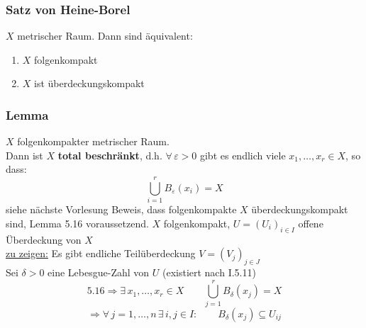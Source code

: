 \subsubsection{Satz von Heine-Borel} %
\label{ssub:satz_von_heine_borel}
$X$ metrischer Raum. Dann sind äquivalent:
\begin{enumerate}
	\item $X$ folgenkompakt
	\item $X$ ist überdeckungskompakt
\end{enumerate}

\subsubsection{Lemma} %
\label{ssub:lemma}
$X$ folgenkompakter metrischer Raum. \\
Dann ist $X$ {\bfseries total beschränkt}, d.h. $\forall\, \varepsilon>0$ gibt es endlich viele $x_1,\dots,x_r \in X$, so dass:
\[
	\bigcup\limits_{i=1}^r B_{\varepsilon}(x_i)=X
\]
 siehe nächste Vorlesung
\newpage
Beweis, dass folgenkompakte $X$ überdeckungskompakt sind, Lemma 5.16 voraussetzend.
$X$ folgenkompakt, $U=(U_i)_{i \in I}$ offene Überdeckung von $X$ \\
\underline{zu zeigen:} Es gibt endliche Teilüberdeckung $V=(V_j)_{j \in J}$ \\
Sei $\delta>0$ eine Lebesgue-Zahl von $U$ (existiert nach I.5.11)
\[
	5.16 \Rightarrow \exists\, x_1, \dots, x_r \in X \qquad \bigcup\limits_{j=1}^r B_{\delta}(x_j)=X
\]
\[
	\Rightarrow \forall\, j=1,\dots,n \, \exists\, i,j \in I: \qquad B_{\delta}(x_j) \subseteq U_{ij}
\]
	